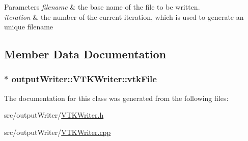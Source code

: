 \begin{DoxyParams}{Parameters}
{\em filename} & the base name of the file to be written. \\
\hline
{\em iteration} & the number of the current iteration, which is used to generate an unique filename \\
\hline
\end{DoxyParams}


\subsection{Member Data Documentation}
\hypertarget{classoutputWriter_1_1VTKWriter_ab654ea4308b92e5dbdcd9a6833d5ed30}{
\subsubsection[{vtk\+File}]{$\ast$ output\+Writer\+::\+V\+T\+K\+Writer\+::vtk\+File\hspace{0.3cm}{\ttfamily [private]}}}\label{classoutputWriter_1_1VTKWriter_ab654ea4308b92e5dbdcd9a6833d5ed30}


The documentation for this class was generated from the following files\+:\begin{DoxyCompactItemize}
\item 
src/output\+Writer/\hyperlink{VTKWriter_8h}{V\+T\+K\+Writer.\+h}\item 
src/output\+Writer/\hyperlink{VTKWriter_8cpp}{V\+T\+K\+Writer.\+cpp}\end{DoxyCompactItemize}
